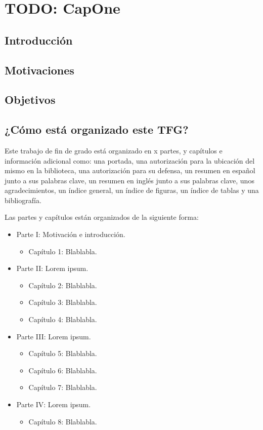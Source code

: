 \chapter{TODO: CapOne}
\section{Introducción}

\section{Motivaciones}

\section{Objetivos}

\section{¿Cómo está organizado este TFG?}
Este trabajo de fin de grado está organizado en x partes, y capítulos e información adicional como: una portada, una autorización para la ubicación del mismo en la biblioteca, una autorización para su defensa, un resumen en español junto a sus palabras clave, un resumen en inglés junto a sus palabras clave, unos agradecimientos, un índice general, un índice de figuras, un índice de tablas y una bibliografía.

Las partes y capítulos están organizados de la siguiente forma:
\begin{itemize}
    \item Parte I: Motivación e introducción. 
    \begin{itemize}
        \item Capítulo 1: Blablabla.
    \end{itemize}

    \item Parte II: Lorem ipsum.
    \begin{itemize}
        \item Capítulo 2: Blablabla.
        \item Capítulo 3: Blablabla.
        \item Capítulo 4: Blablabla.
    \end{itemize}

    \item Parte III: Lorem ipsum.
    \begin{itemize}
        \item Capítulo 5: Blablabla.
        \item Capítulo 6: Blablabla.
        \item Capítulo 7: Blablabla.
    \end{itemize}

    \item Parte IV: Lorem ipsum.
    \begin{itemize}
        \item Capítulo 8: Blablabla.
    \end{itemize}
\end{itemize}
